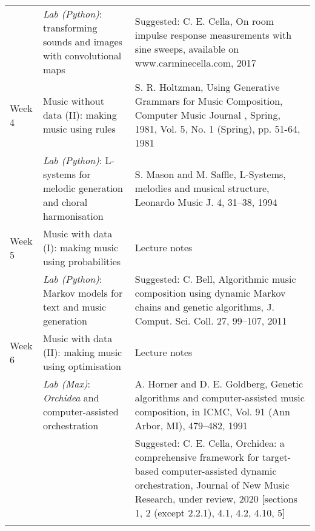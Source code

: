 \documentclass[letterpaper]{inzane_syllabus} %
\begin{document}
\begin{center}
\begin{tabularx}{\textwidth}{p{2cm}p{8cm} @{\hskip 0.5cm} p{9.5cm}}
& \emph{Lab (Python)}: transforming sounds and images with convolutional maps & Suggested: C. E. Cella, On room impulse response measurements with sine sweeps, available on www.carminecella.com, 2017 \\
\arrayrulecolor{maingray}\hline

Week 4 & Music without data (II): making music using rules &  S. R. Holtzman, Using Generative Grammars for Music Composition, Computer Music Journal , Spring, 1981, Vol. 5, No. 1 (Spring), pp. 51-64, 1981\\

&  \emph{Lab (Python)}: L-systems for melodic generation and choral harmonisation&  S. Mason and M. Saffle, L-Systems, melodies and musical structure, Leonardo Music J. 4, 31–38, 1994 \\
\arrayrulecolor{maingray}\hline
\arrayrulecolor{maingray}\hline
\arrayrulecolor{maingray}\hline
\arrayrulecolor{maingray}\hline

Week 5 & Music with data (I): making music using probabilities & Lecture notes \\

& \emph{Lab (Python)}: Markov models for text and music generation & Suggested: C. Bell, Algorithmic music composition using dynamic Markov chains and genetic algorithms, J. Comput. Sci. Coll. 27, 99–107, 2011\\
\arrayrulecolor{maingray}\hline

Week 6 & Music with data (II): making music using optimisation &  Lecture notes\\
 
& \emph{Lab (Max)}: \emph{Orchidea} and computer-assisted orchestration & A. Horner and D. E. Goldberg, Genetic algorithms and computer-assisted  music composition, in ICMC, Vol. 91 (Ann Arbor, MI), 479–482, 1991 \\
& & Suggested: C. E. Cella, Orchidea: a comprehensive framework for target-based computer-assisted dynamic orchestration, Journal of New Music Research, under review, 2020 [sections 1, 2 (except 2.2.1), 4.1, 4.2, 4.10, 5]  \\
\arrayrulecolor{maingray}\hline


\end{tabularx}
\end{center}
\end{document}
